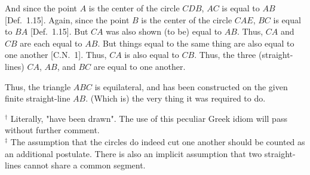 \begin{Parallel}{}{}
{And since the point $A$ is the center of the circle $CDB$, $AC$ is equal to $AB$ [Def.~1.15]. Again,
since the point $B$ is the center of the circle $CAE$, $BC$ is equal to $BA$ [Def.~1.15]. But $CA$ 
was also shown (to be) equal to $AB$. Thus, $CA$ and $CB$ are each equal to $AB$. But things equal to the same thing are also equal to one another [C.N.~1]. Thus, $CA$ is also equal to $CB$. Thus, the three (straight-lines) $CA$, $AB$, and $BC$ are equal to one another.

Thus, the triangle $ABC$ is equilateral, and has been constructed on the
given finite straight-line $AB$. (Which is) the very thing it was required to do.}
\end{Parallel}
{\footnotesize
\noindent $^\dag$ Literally, "have been drawn". The use of this peculiar Greek idiom will pass
without further comment.\\
\noindent $^\ddag$ The assumption that the circles do indeed cut one another should be counted as an additional 
postulate. There is also an implicit assumption that two straight-lines cannot share a common segment.}

